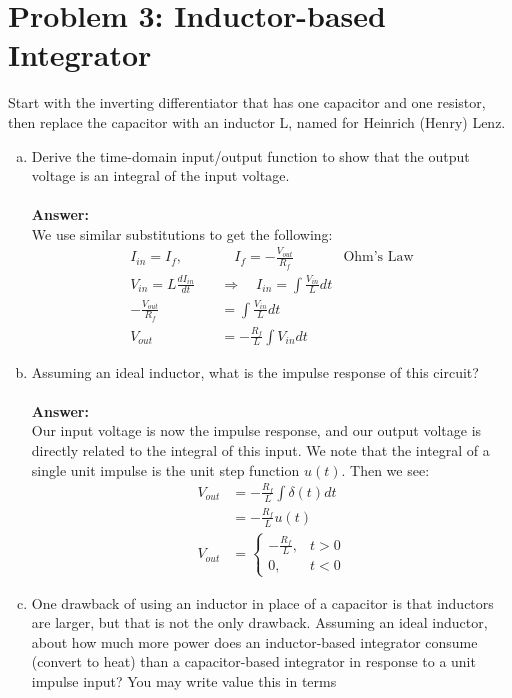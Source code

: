 \documentclass[12pt, a4paper]{article}
\begin{document}
\section*{Problem 3: Inductor-based Integrator}
Start with the inverting differentiator that has one capacitor and one resistor, then replace
the capacitor with an inductor L, named for Heinrich (Henry) Lenz.
\begin{enumerate}[(a)]
\item Derive the time-domain input/output function to show that the output voltage is an
integral of the input voltage. \\ \\
\textbf{Answer: } \\
We use similar substitutions to get the following:
\begin{align*}
I_{in} = I_{f}, &\quad  I_f = -\frac{V_{out}}{R_f} &\text{Ohm's Law} \\
V_{in} = L \frac{dI_{in}}{dt} \quad &\Rightarrow \quad I_{in} = \int \frac{V_{in}}{L} dt \\
-\frac{V_{out}}{R_f} &= \int \frac{V_{in}}{L} dt \\
V_{out} &= -\frac{R_f}{L} \int V_{in} dt
\end{align*}
\item Assuming an ideal inductor, what is the impulse response of this circuit?\\ \\
\textbf{Answer:} \\
Our input voltage is now the impulse response, and our output voltage is directly related to the integral of this input. We note that the integral of a single unit impulse is the unit step function $u(t)$. Then we see:
\begin{align*}
V_{out} &= -\frac{R_f}{L} \int \delta(t) dt \\
&= -\frac{R_f}{L} u(t) \\
   V_{out} &= \begin{cases}
      -\frac{R_f}{L}, & t > 0 \\
      0, & t < 0
    \end{cases}
\end{align*}
\item One drawback of using an inductor in place of a capacitor is that inductors are larger,
but that is not the only drawback. Assuming an ideal inductor, about how much more
power does an inductor-based integrator consume (convert to heat) than a capacitor-based
integrator in response to a unit impulse input? You may write value this in terms

\end{enumerate}
\end{document}
